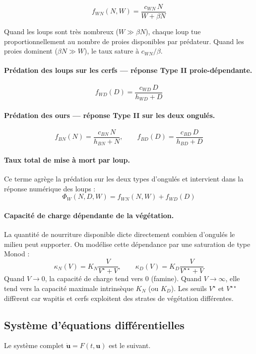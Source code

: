 \documentclass[12pt,a4paper]{article}
\begin{document}
\[
f_{WN}(N, W) = \frac{c_{WN}\, N}{W + \beta N}
\]

Quand les loups sont très nombreux ($W \gg \beta N$), chaque loup tue proportionnellement
au nombre de proies disponibles par prédateur. Quand les proies dominent ($\beta N \gg W$),
le taux sature à $c_{WN}/\beta$.

\paragraph{Prédation des loups sur les cerfs — réponse Type II proie-dépendante.}
\[
f_{WD}(D) = \frac{c_{WD}\, D}{h_{WD} + D}
\]

\paragraph{Prédation des ours — réponse Type II sur les deux ongulés.}
\[
f_{BN}(N) = \frac{c_{BN}\, N}{h_{BN} + N}, \qquad f_{BD}(D) = \frac{c_{BD}\, D}{h_{BD} + D}
\]

\paragraph{Taux total de mise à mort par loup.}
Ce terme agrège la prédation sur les deux types d'ongulés et intervient dans la réponse
numérique des loups :
\[
\Phi_W(N, D, W) = f_{WN}(N,W) + f_{WD}(D)
\]

\paragraph{Capacité de charge dépendante de la végétation.}
La quantité de nourriture disponible dicte directement combien d'ongulés le milieu peut
supporter. On modélise cette dépendance par une saturation de type Monod :
\[
\kappa_N(V) = K_N \frac{V}{V^\star + V}, \qquad \kappa_D(V) = K_D \frac{V}{V^{\star\star} + V}
\]
Quand $V \to 0$, la capacité de charge tend vers 0 (famine). Quand $V \to \infty$, elle
tend vers la capacité maximale intrinsèque $K_N$ (ou $K_D$). Les seuils $V^\star$ et
$V^{\star\star}$ diffèrent car wapitis et cerfs exploitent des strates de végétation
différentes.

\subsection{Système d'équations différentielles}

Le système complet $\dot{\mathbf{u}} = F(t, \mathbf{u})$ est le suivant.
\end{document}
